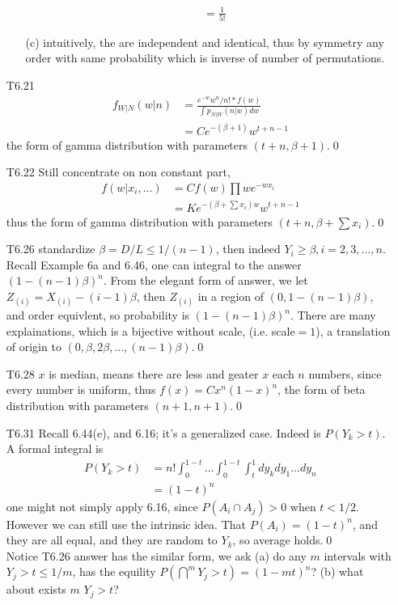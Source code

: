 \documentclass[paper=a4, fontsize=11pt]{scrartcl} %
\numberwithin{equation}{section} %
\numberwithin{figure}{section} %
\numberwithin{table}{section} %
\begin{document}
\begin{itemize}
\begin{itemize}
\begin{align}
				&= \frac{1}{5!}
		\end{align}
		\item[(c)] intuitively, the are independent and identical, thus by symmetry any order with same probability which is inverse of number of permutations.
	\end{itemize}
	\item[T6.21]
	\begin{align}
		f_{W|N}(w|n) &= \frac{e^{-w}w^n/n! * f(w)}{\int p_{N|W}(n|w)dw} \\
			&= C e^{-(\beta+1)}w^{t+n-1}
	\end{align}
	the form of gamma distribution with parameters $(t+n,\beta+1)$.\qed
	\item[T6.22] Still concentrate on non constant part,
	\begin{align}
		f(w|x_i,...) &= C f(w)\prod we^{-wx_i} \\
			&= K e^{-(\beta+\sum x_i)w} w^{t+n-1}
	\end{align}
	thus the form of gamma distribution with parameters $(t+n, \beta+\sum x_i)$.\qed
	\item[T6.26] standardize $\beta=D/L\leq 1/(n-1)$, then indeed $Y_i\geq \beta,i=2,3,...,n$. Recall Example 6a and 6.46, one can integral to the answer $(1-(n-1)\beta)^n$. From the elegant form of answer, we let $Z_{(i)} = X_{(i)} - (i-1)\beta$, then $Z_{(i)}$ in a region of $(0, 1-(n-1)\beta)$, and order equivlent, so probability is $(1-(n-1)\beta)^n$. There are many explainations, which is a bijective without scale, (i.e. scale$=1$), a translation of origin to $(0,\beta,2\beta,...,(n-1)\beta)$.\qed
	\item[T6.28] $x$ is median, means there are less and geater $x$ each $n$ numbers, since every number is uniform, thus $f(x)=Cx^n(1-x)^n$, the form of beta distribution with parameters $(n+1,n+1)$.\qed
	\item[T6.31] Recall 6.44(e), and 6.16; it's a generalized case. Indeed is $P(Y_k>t)$. A formal integral is
	\begin{align}
		P(Y_k>t) &= n!\int_0^{1-t}\dots\int_0^{1-t}\int_t^1 dy_k dy_1\dots dy_n\\
			&= (1-t)^n
	\end{align}
	one might not simply apply 6.16, since $P(A_i\cap A_j)>0$ when $t<1/2$. However we can still use the intrinsic idea. That $P(A_i)=(1-t)^n$, and they are all equal, and they are random to $Y_k$, so average holds.\qed\\
	Notice T6.26 answer has the similar form, we ask (a) do any $m$ intervals with $Y_j>t\leq 1/m$, has the equility $P(\bigcap^m Y_j>t) = (1-mt)^n$? (b) what about exists $m$ $Y_j>t$?

\end{itemize}
\end{document}
